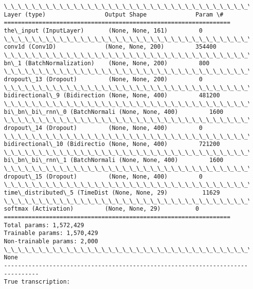 \documentclass[11pt]{article}
\begin{document}
    \begin{Verbatim}[commandchars=\\\{\}]
\_\_\_\_\_\_\_\_\_\_\_\_\_\_\_\_\_\_\_\_\_\_\_\_\_\_\_\_\_\_\_\_\_\_\_\_\_\_\_\_\_\_\_\_\_\_\_\_\_\_\_\_\_\_\_\_\_\_\_\_\_\_\_\_\_
Layer (type)                 Output Shape              Param \#   
=================================================================
the\_input (InputLayer)       (None, None, 161)         0         
\_\_\_\_\_\_\_\_\_\_\_\_\_\_\_\_\_\_\_\_\_\_\_\_\_\_\_\_\_\_\_\_\_\_\_\_\_\_\_\_\_\_\_\_\_\_\_\_\_\_\_\_\_\_\_\_\_\_\_\_\_\_\_\_\_
conv1d (Conv1D)              (None, None, 200)         354400    
\_\_\_\_\_\_\_\_\_\_\_\_\_\_\_\_\_\_\_\_\_\_\_\_\_\_\_\_\_\_\_\_\_\_\_\_\_\_\_\_\_\_\_\_\_\_\_\_\_\_\_\_\_\_\_\_\_\_\_\_\_\_\_\_\_
bn\_1 (BatchNormalization)    (None, None, 200)         800       
\_\_\_\_\_\_\_\_\_\_\_\_\_\_\_\_\_\_\_\_\_\_\_\_\_\_\_\_\_\_\_\_\_\_\_\_\_\_\_\_\_\_\_\_\_\_\_\_\_\_\_\_\_\_\_\_\_\_\_\_\_\_\_\_\_
dropout\_13 (Dropout)         (None, None, 200)         0         
\_\_\_\_\_\_\_\_\_\_\_\_\_\_\_\_\_\_\_\_\_\_\_\_\_\_\_\_\_\_\_\_\_\_\_\_\_\_\_\_\_\_\_\_\_\_\_\_\_\_\_\_\_\_\_\_\_\_\_\_\_\_\_\_\_
bidirectional\_9 (Bidirection (None, None, 400)         481200    
\_\_\_\_\_\_\_\_\_\_\_\_\_\_\_\_\_\_\_\_\_\_\_\_\_\_\_\_\_\_\_\_\_\_\_\_\_\_\_\_\_\_\_\_\_\_\_\_\_\_\_\_\_\_\_\_\_\_\_\_\_\_\_\_\_
bi\_bn\_bi\_rnn\_0 (BatchNormali (None, None, 400)         1600      
\_\_\_\_\_\_\_\_\_\_\_\_\_\_\_\_\_\_\_\_\_\_\_\_\_\_\_\_\_\_\_\_\_\_\_\_\_\_\_\_\_\_\_\_\_\_\_\_\_\_\_\_\_\_\_\_\_\_\_\_\_\_\_\_\_
dropout\_14 (Dropout)         (None, None, 400)         0         
\_\_\_\_\_\_\_\_\_\_\_\_\_\_\_\_\_\_\_\_\_\_\_\_\_\_\_\_\_\_\_\_\_\_\_\_\_\_\_\_\_\_\_\_\_\_\_\_\_\_\_\_\_\_\_\_\_\_\_\_\_\_\_\_\_
bidirectional\_10 (Bidirectio (None, None, 400)         721200    
\_\_\_\_\_\_\_\_\_\_\_\_\_\_\_\_\_\_\_\_\_\_\_\_\_\_\_\_\_\_\_\_\_\_\_\_\_\_\_\_\_\_\_\_\_\_\_\_\_\_\_\_\_\_\_\_\_\_\_\_\_\_\_\_\_
bi\_bn\_bi\_rnn\_1 (BatchNormali (None, None, 400)         1600      
\_\_\_\_\_\_\_\_\_\_\_\_\_\_\_\_\_\_\_\_\_\_\_\_\_\_\_\_\_\_\_\_\_\_\_\_\_\_\_\_\_\_\_\_\_\_\_\_\_\_\_\_\_\_\_\_\_\_\_\_\_\_\_\_\_
dropout\_15 (Dropout)         (None, None, 400)         0         
\_\_\_\_\_\_\_\_\_\_\_\_\_\_\_\_\_\_\_\_\_\_\_\_\_\_\_\_\_\_\_\_\_\_\_\_\_\_\_\_\_\_\_\_\_\_\_\_\_\_\_\_\_\_\_\_\_\_\_\_\_\_\_\_\_
time\_distributed\_5 (TimeDist (None, None, 29)          11629     
\_\_\_\_\_\_\_\_\_\_\_\_\_\_\_\_\_\_\_\_\_\_\_\_\_\_\_\_\_\_\_\_\_\_\_\_\_\_\_\_\_\_\_\_\_\_\_\_\_\_\_\_\_\_\_\_\_\_\_\_\_\_\_\_\_
softmax (Activation)         (None, None, 29)          0         
=================================================================
Total params: 1,572,429
Trainable params: 1,570,429
Non-trainable params: 2,000
\_\_\_\_\_\_\_\_\_\_\_\_\_\_\_\_\_\_\_\_\_\_\_\_\_\_\_\_\_\_\_\_\_\_\_\_\_\_\_\_\_\_\_\_\_\_\_\_\_\_\_\_\_\_\_\_\_\_\_\_\_\_\_\_\_
None
--------------------------------------------------------------------------------
True transcription:


\end{Verbatim}
\end{document}
